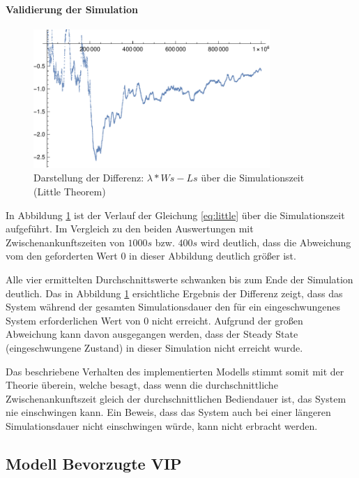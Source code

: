 \paragraph{Validierung der Simulation}
\begin{figure}[htpb]
	\centering
	\includegraphics[width=0.8\textwidth]{abbildungen/1_Phone/Arrival_100_Serve_100_dur_1000000_Skip_0/LittleSystem.pdf}
	\caption{Darstellung der Differenz: $\lambda * Ws - Ls$ über die Simulationszeit (Little Theorem)}
	\label{fig:LittleSystem100}
\end{figure} 
In Abbildung \ref{fig:LittleSystem100} ist der Verlauf der Gleichung \ref{eq:little} über die Simulationszeit aufgeführt. Im Vergleich zu den beiden Auswertungen mit Zwischenankunftszeiten von $1000s$ bzw. $400s$ wird deutlich, dass die Abweichung vom den geforderten Wert $0$ in dieser Abbildung deutlich größer ist.  

Alle vier ermittelten Durchschnittswerte schwanken bis zum Ende der Simulation deutlich. Das in Abbildung \ref{fig:LittleSystem100} ersichtliche Ergebnis der Differenz zeigt, dass das System während der gesamten Simulationsdauer den für ein eingeschwungenes System erforderlichen Wert von $0$ nicht erreicht. Aufgrund der großen Abweichung kann davon ausgegangen werden, dass der Steady State (eingeschwungene Zustand) in dieser Simulation nicht erreicht wurde. 

Das beschriebene Verhalten des implementierten Modells stimmt somit mit der Theorie überein, welche besagt, dass wenn die durchschnittliche Zwischenankunftszeit gleich der durchschnittlichen Bediendauer ist, das System nie einschwingen kann. Ein Beweis, dass das System auch bei einer längeren Simulationsdauer nicht einschwingen würde, kann nicht erbracht werden.

\subsection{Modell \glqq Bevorzugte VIP\grqq} 

